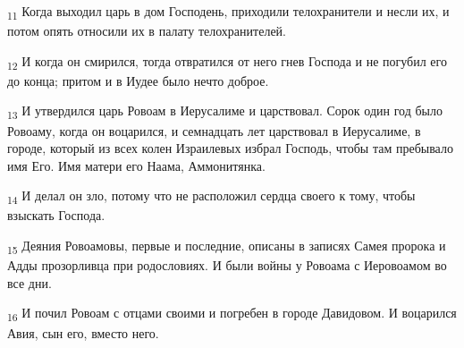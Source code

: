 \begin{tcolorbox}
\textsubscript{11} Когда выходил царь в дом Господень, приходили телохранители и несли их, и потом опять относили их в палату телохранителей.
\end{tcolorbox}
\begin{tcolorbox}
\textsubscript{12} И когда он смирился, тогда отвратился от него гнев Господа и не погубил его до конца; притом и в Иудее было нечто доброе.
\end{tcolorbox}
\begin{tcolorbox}
\textsubscript{13} И утвердился царь Ровоам в Иерусалиме и царствовал. Сорок один год было Ровоаму, когда он воцарился, и семнадцать лет царствовал в Иерусалиме, в городе, который из всех колен Израилевых избрал Господь, чтобы там пребывало имя Его. Имя матери его Наама, Аммонитянка.
\end{tcolorbox}
\begin{tcolorbox}
\textsubscript{14} И делал он зло, потому что не расположил сердца своего к тому, чтобы взыскать Господа.
\end{tcolorbox}
\begin{tcolorbox}
\textsubscript{15} Деяния Ровоамовы, первые и последние, описаны в записях Самея пророка и Адды прозорливца при родословиях. И были войны у Ровоама с Иеровоамом во все дни.
\end{tcolorbox}
\begin{tcolorbox}
\textsubscript{16} И почил Ровоам с отцами своими и погребен в городе Давидовом. И воцарился Авия, сын его, вместо него.
\end{tcolorbox}
